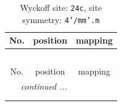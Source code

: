 \documentclass[fleqn,8pt]{jsarticle}
\begin{document}
\renewcommand{\arraystretch}{1.2}
\begin{longtable}{ccc}
\caption{Wyckoff site: {\tt 24c}, site symmetry: {\tt 4'/mm'.m}}
 \\
 \hline \hline
No. & position & mapping \\ \hline \endfirsthead

\multicolumn{2}{l}{\tablename\ \thetable{}} \\
 \hline \hline
No. & position & mapping \\ \hline \endhead

 \hline \hline
\multicolumn{2}{r}{\footnotesize\it continued ...} \\ \endfoot

 \hline \hline
\multicolumn{2}{r}{} \\ \endlastfoot


\end{longtable}
\end{document}
